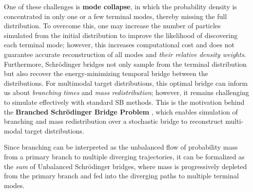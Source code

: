 \documentclass{article}
\newcommand{\boldtext}[1]{\textbf{\textcolor{MyGreen}{#1}}}
\begin{document}
One of these challenges is \textbf{mode collapse}, in which the probability density is concentrated in only one or a few terminal modes, thereby missing the full distribution. To overcome this, one may increase the number of particles simulated from the initial distribution to improve the likelihood of discovering each terminal mode; however, this increases computational cost and does not guarantee accurate reconstruction of all modes and \textit{their relative density weights}. Furthermore, Schrödinger bridges not only sample from the terminal distribution but also recover the energy-minimizing temporal bridge between the distributions. For multimodal target distributions, this optimal bridge can inform us about \textit{branching times} and \textit{mass redistribution}; however, it remains challenging to simulate effectively with standard SB methods. This is the motivation behind the \boldtext{Branched Schrödinger Bridge Problem} \citep{tang2026branchsbm}, which enables simulation of branching and mass redistribution over a stochastic bridge to reconstruct multi-modal target distributions.

Since branching can be interpreted as the unbalanced flow of probability mass from a primary branch to multiple diverging trajectories, it can be formalized as the \textit{sum} of Unbalanced Schrödinger bridges, where mass is progressively depleted from the primary branch and fed into the diverging paths to multiple terminal modes.
\end{document}
